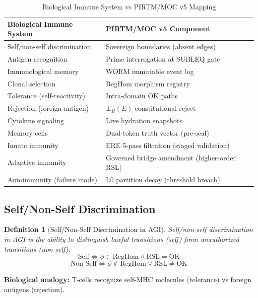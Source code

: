 \documentclass[11pt,a4paper]{article}
\newtheorem{definition}[theorem]{Definition}
\begin{document}
\begin{table}[h]
\centering
\caption{Biological Immune System vs PIRTM/MOC v5 Mapping}
\label{tab:immune_mapping}
\begin{tabular}{@{}l l@{}}
\toprule
\textbf{Biological Immune System} & \textbf{PIRTM/MOC v5 Component} \\
\midrule
Self/non-self discrimination & Sovereign boundaries (absent edges) \\
Antigen recognition & Prime interrogation at SUBLEQ gate \\
Immunological memory & WORM immutable event log \\
Clonal selection & RegHom morphism registry \\
Tolerance (self-reactivity) & Intra-domain OK paths \\
Rejection (foreign antigen) & $\bot_R(E)$ constitutional reject \\
Cytokine signaling & Live hydration snapshots \\
Memory cells & Dual-token truth vector (pre-seal) \\
Innate immunity & ERE 5-pass filtration (staged validation) \\
Adaptive immunity & Governed bridge amendment (higher-order RSL) \\
Autoimmunity (failure mode) & L0 partition decay (threshold breach) \\
\bottomrule
\end{tabular}
\end{table}

\subsection{Self/Non-Self Discrimination}

\begin{definition}[Self/Non-Self Discrimination in AGI]
Self/non-self discrimination in AGI is the ability to distinguish lawful transitions (self) from unauthorized transitions (non-self):
\begin{equation}
\text{Self} \iff \phi \in \text{RegHom} \land \text{RSL} = \text{OK}
\end{equation}
\begin{equation}
\text{Non-Self} \iff \phi \notin \text{RegHom} \lor \text{RSL} \neq \text{OK}
\end{equation}
\end{definition}

\textbf{Biological analogy:} T-cells recognize self-MHC molecules (tolerance) vs foreign antigens (rejection).
\end{document}
